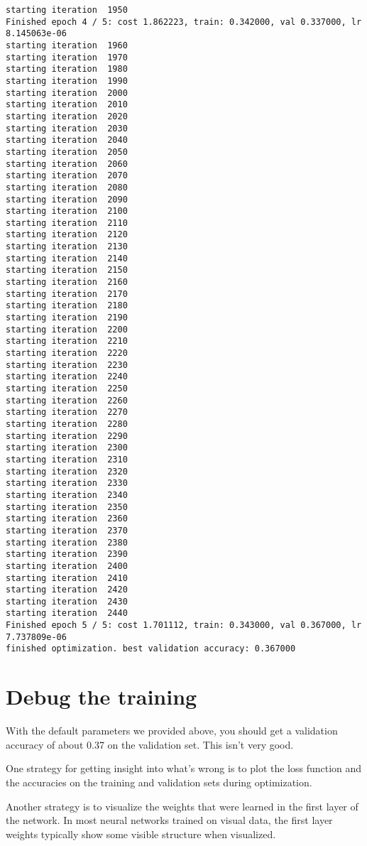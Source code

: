 \documentclass[11pt]{article}
\begin{document}
\begin{Verbatim}[commandchars=\\\{\}]
starting iteration  1950
Finished epoch 4 / 5: cost 1.862223, train: 0.342000, val 0.337000, lr 8.145063e-06
starting iteration  1960
starting iteration  1970
starting iteration  1980
starting iteration  1990
starting iteration  2000
starting iteration  2010
starting iteration  2020
starting iteration  2030
starting iteration  2040
starting iteration  2050
starting iteration  2060
starting iteration  2070
starting iteration  2080
starting iteration  2090
starting iteration  2100
starting iteration  2110
starting iteration  2120
starting iteration  2130
starting iteration  2140
starting iteration  2150
starting iteration  2160
starting iteration  2170
starting iteration  2180
starting iteration  2190
starting iteration  2200
starting iteration  2210
starting iteration  2220
starting iteration  2230
starting iteration  2240
starting iteration  2250
starting iteration  2260
starting iteration  2270
starting iteration  2280
starting iteration  2290
starting iteration  2300
starting iteration  2310
starting iteration  2320
starting iteration  2330
starting iteration  2340
starting iteration  2350
starting iteration  2360
starting iteration  2370
starting iteration  2380
starting iteration  2390
starting iteration  2400
starting iteration  2410
starting iteration  2420
starting iteration  2430
starting iteration  2440
Finished epoch 5 / 5: cost 1.701112, train: 0.343000, val 0.367000, lr 7.737809e-06
finished optimization. best validation accuracy: 0.367000

    \end{Verbatim}

    \section{Debug the training}\label{debug-the-training}

With the default parameters we provided above, you should get a
validation accuracy of about 0.37 on the validation set. This isn't very
good.

One strategy for getting insight into what's wrong is to plot the loss
function and the accuracies on the training and validation sets during
optimization.

Another strategy is to visualize the weights that were learned in the
first layer of the network. In most neural networks trained on visual
data, the first layer weights typically show some visible structure when
visualized.
\end{document}
